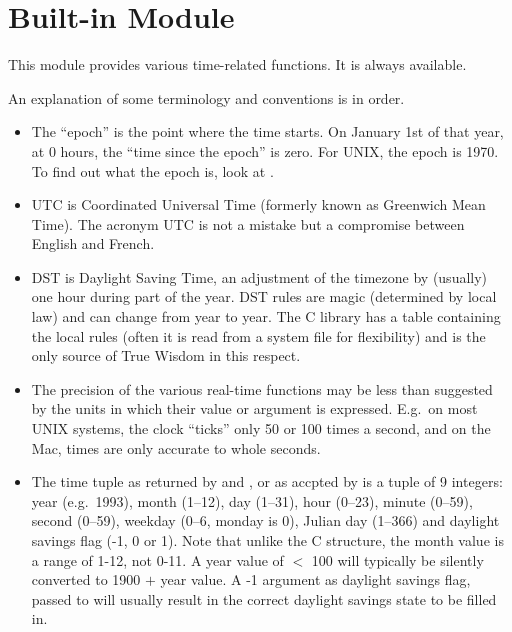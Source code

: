 \section{Built-in Module }

This module provides various time-related functions.
It is always available.

An explanation of some terminology and conventions is in order.

\begin{itemize}

\item
The ``epoch'' is the point where the time starts.  On January 1st of that
year, at 0 hours, the ``time since the epoch'' is zero.  For UNIX, the
epoch is 1970.  To find out what the epoch is, look at .

\item
UTC is Coordinated Universal Time (formerly known as Greenwich Mean
Time).  The acronym UTC is not a mistake but a compromise between
English and French.

\item
DST is Daylight Saving Time, an adjustment of the timezone by
(usually) one hour during part of the year.  DST rules are magic
(determined by local law) and can change from year to year.  The C
library has a table containing the local rules (often it is read from
a system file for flexibility) and is the only source of True Wisdom
in this respect.

\item
The precision of the various real-time functions may be less than
suggested by the units in which their value or argument is expressed.
E.g.\ on most UNIX systems, the clock ``ticks'' only 50 or 100 times a
second, and on the Mac, times are only accurate to whole seconds.

\item
The time tuple as returned by  and ,
or as accpted by  is a tuple of 9
integers: year (e.g.\ 1993), month (1--12), day (1--31), hour
(0--23), minute (0--59), second (0--59), weekday (0--6, monday is 0),
Julian day (1--366) and daylight savings flag (-1, 0  or 1).
Note that unlike the C structure, the month value is a range of 1-12, not
0-11.  A year value of $<$ 100 will typically be silently converted to
1900 $+$ year value.  A -1 argument as daylight savings flag, passed to
 will usually result in the correct daylight savings
state to be filled in.


\end{itemize}

